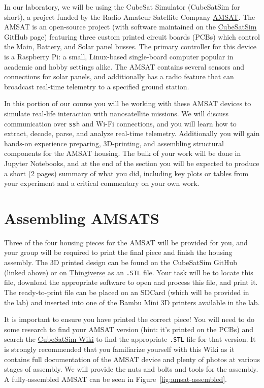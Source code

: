 \documentclass{tufte-book}
\begin{document}
In our laboratory, we will be using the CubeSat Simulator (CubeSatSim for short), a project funded by the Radio Amateur Satellite Company \href{https://www.amsat.org/}{AMSAT}. The AMSAT is an open-source project (with software maintained on the \href{https://github.com/alanbjohnston/CubeSatSim}{CubeSatSim} GitHub page) featuring three custom printed circuit boards (PCBs) which control the Main, Battery, and Solar panel busses. The primary controller for this device is a Raspberry Pi: a small, Linux-based single-board computer popular in academic and hobby settings alike. The AMSAT contains several sensors and connections for solar panels, and additionally has a radio feature that can broadcast real-time telemetry to a specified ground station.

In this portion of our course you will be working with these AMSAT devices to simulate real-life interaction with nanosatellite missions. We will discuss communication over \verb|ssh| and Wi-Fi connections, and you will learn how to extract, decode, parse, and analyze real-time telemetry. Additionally you will gain hands-on experience preparing, 3D-printing, and assembling structural components for the AMSAT housing. The bulk of your work will be done in Jupyter Notebooks, and at the end of the section you will be expected to produce a short (2 pages) summary of what you did, including key plots or tables from your experiment and a critical commentary on your own work.


\section{Assembling AMSATS}

Three of the four housing pieces for the AMSAT will be provided for you, and your group will be required to print the final piece and finish the housing assembly. The 3D printed design can be found on the CubeSatSim GitHub (linked above) or on \href{https://www.thingiverse.com/}{Thingiverse} as an \verb|.STL| file. Your task will be to locate this file, download the appropriate software to open and process this file, and print it. The ready-to-print file can be placed on an SDCard (which will be provided in the lab) and inserted into one of the Bambu Mini 3D printers available in the lab.

It is important to ensure you have printed the correct piece! You will need to do some research to find your AMSAT version (hint: it's printed on the PCBs) and search the \href{https://github.com/alanbjohnston/CubeSatSim/wiki}{CubeSatSim Wiki} to find the appropriate \verb|.STL| file for that version. It is strongly recommended that you familiarize yourself with this Wiki as it contains full documentation of the AMSAT device and plenty of photos at various stages of assembly. We will provide the nuts and bolts and tools for the assembly. A fully-assembled AMSAT can be seen in Figure~\ref{fig:amsat-assembled}.  
\end{document}
